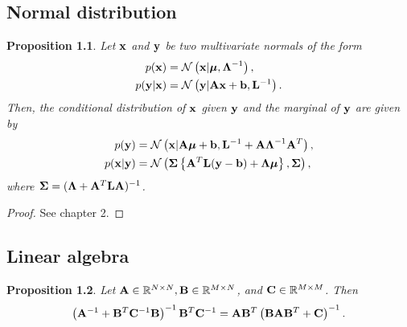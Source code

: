 \documentclass[12pt, oneside]{book}
\numberwithin{equation}{section}
\newcommand{\x}{{\bf x}}
\newcommand{\N}{\mathcal{N}}
\newcommand{\R}{\mathbb{R}}
\newtheorem{proposition}{Proposition}[section]
\begin{document}
{\begin{appendices}
\chapter{}
\section{Normal distribution}
\begin{proposition} \label{prop:multivariate-normal-combination}
	Let $\x$ and ${\bf y}$ be two multivariate normals of the form
	\begin{align}
		p(\x) &= \N\left(\x \vert \boldsymbol\mu, \boldsymbol\Lambda^{-1}\right),\\
		p({\bf y} \vert \x ) &= \N\left({\bf y} \vert {\bf A}\x + {\bf b}, {\bf L}^{-1}\right).
	\end{align}
	Then, the conditional distribution of $\x$ given ${\bf y}$ and the marginal of ${\bf y}$ are given by
	\begin{align}
		p({\bf y}) &= \N\left(\x\vert {\bf A}\boldsymbol\mu + {\bf b}, {\bf L}^{-1} + {\bf A}\boldsymbol\Lambda^{-1}{\bf A}^T\right), \label{eq:normal-marginal}\\
		p(\x \vert {\bf y}) &= \N\left(\boldsymbol\Sigma\left\{{\bf A}^T {\bf L}({\bf y} - {\bf b})  + \boldsymbol\Lambda\boldsymbol\mu \right\}, \boldsymbol\Sigma\right) \label{eq:normal-conditional},
	\end{align}
	where $\boldsymbol{\Sigma} = (\boldsymbol\Lambda + {\bf A}^T {\bf L} {\bf A})^{-1}$.
\end{proposition}

\begin{proof}
	See \cite{prml} chapter 2.
\end{proof}

\section{Linear algebra}
\begin{proposition} \label{prop:matrix-rewrite1}
	Let ${\bf A} \in \R^{N\times N}, {\bf B}\in \R^{M\times N}$, and ${\bf C}\in\R^{M\times M}$. Then
	\begin{equation}
		\left({\bf A}^{-1} + {\bf B}^T {\bf C}^{-1} {\bf B}\right)^{-1}{\bf B}^T {\bf C}^{-1} = {\bf A}{\bf B}^T\left({\bf B}{\bf A}{\bf B}^T + {\bf C}\right)^{-1}.
	\end{equation}
\end{proposition}


\end{appendices}}
\end{document}
